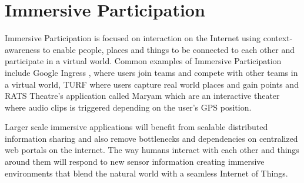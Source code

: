 \section{Immersive Participation}
Immersive Participation is focused on interaction on the Internet using context-awareness to enable people, places and things to be connected to each other and participate in a virtual world. Common examples of Immersive Participation include Google Ingress \cite{ingress}, where users join teams and compete with other teams in a virtual world, TURF \cite{turf} where users capture real world places and gain points and RATS Theatre's \cite{rats} application called Maryam \cite{maryam} which are an interactive theater where audio clips is triggered depending on the user's GPS position.

Larger scale immersive applications will benefit from scalable distributed information sharing and also remove bottlenecks and dependencies on centralized web portals on the internet.
The way humans interact with each other and things around them will respond to new sensor information creating immersive environments that blend the natural world with a seamless Internet of Things.

